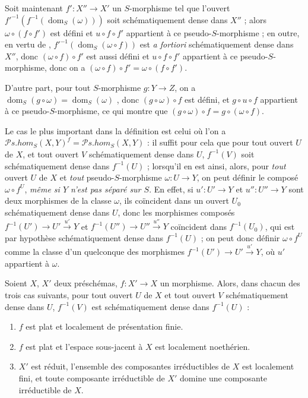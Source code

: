 \begin{env}[20.3.3]
\label{IV.20.3.3}
Soit maintenant $f':X''\to X'$ un $S$-morphisme tel que l'ouvert $f'^{-1}(f^{-1}(\operatorname{dom}_S(\omega)))$ soit schématiquement dense dans $X''$ ; alors $\omega\circ(f\circ f')$ est défini et $u\circ f\circ f'$ appartient à ce pseudo-$S$-morphisme ; en outre, en vertu de , $f'^{-1}(\operatorname{dom}_S(\omega\circ f))$ est \emph{a fortiori} schématiquement dense dans $X''$, donc $(\omega\circ f)\circ f'$ est aussi défini et $u\circ f\circ f'$ appartient à ce pseudo-$S$-morphisme, donc on a $(\omega\circ f)\circ f'=\omega\circ(f\circ f')$.

D'autre part, pour tout $S$-morphisme $g:Y\to Z$, on a $\operatorname{dom}_S(g\circ\omega)=\operatorname{dom}_S(\omega)$ , donc $(g\circ\omega)\circ f$ est défini, et $g\circ u\circ f$ appartient à ce pseudo-$S$-morphisme, ce qui montre que $(g\circ\omega)\circ f=g\circ(\omega\circ f)$.
\end{env}

\begin{env}[20.3.4]
\label{IV.20.3.4}
Le cas le plus important dans la définition  est celui où l'on a $\mathscr{P}\!s.\mathit{hom}_S(X,Y)^f=\mathscr{P}\!s.\mathit{hom}_S(X,Y)$ : il suffit pour cela que pour tout ouvert $U$ de $X$, et tout ouvert $V$ schématiquement dense dans $U$, $f^{-1}(V)$ soit schématiquement dense dans $f^{-1}(U)$ ; lorsqu'il en est ainsi, alors, pour \emph{tout} ouvert $U$ de $X$ et \emph{tout} pseudo-$S$-morphisme $\omega:U\to Y$, on peut définir le composé $\omega\circ f^U$, \emph{même si $Y$ n'est pas séparé sur $S$}.
En effet, si $u':U'\to Y$ et $u'':U''\to Y$ sont deux morphismes de la classe $\omega$, ils coïncident dans un ouvert $U_0$ schématiquement dense dans $U$, donc les morphismes composés $f^{-1}(U')\to U'\xrightarrow{u'}Y$ et $f^{-1}(U'')\to U''\xrightarrow{u''}Y$ coïncident dans $f^{-1}(U_0)$, qui est par hypothèse schématiquement dense dans $f^{-1}(U)$ ; on peut donc définir $\omega\circ f^U$ comme la classe d'un quelconque des morphismes $f^{-1}(U')\to U'\xrightarrow{u'}Y$, où $u'$ appartient à $\omega$.
\end{env}

\begin{proposition}[20.3.5]
Soient $X$, $X'$ deux préschémas, $f:X'\to X$ un morphisme.
Alors, dans chacun des trois cas suivants, pour tout ouvert $U$ de $X$ et tout ouvert $V$ schématiquement dense dans $U$, $f^{-1}(V)$ est schématiquement dense dans $f^{-1}(U)$ :
\begin{enumerate}[label=\emph{(\roman*)}]
  \item $f$ est plat et localement de présentation finie.
  \item $f$ est plat et l'espace sous-jacent à $X$ est localement noethérien.
  \item $X'$ est réduit, l'ensemble des composantes irréductibles de $X$ est localement fini, et toute composante irréductible de $X'$ domine une composante irréductible de $X$.
\end{enumerate}
\end{proposition}

